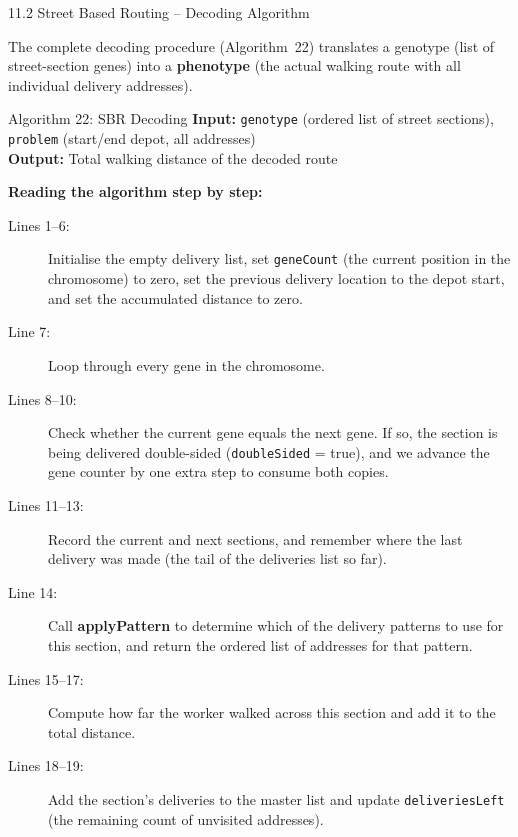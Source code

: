 \documentclass[aspectratio=169,10pt]{beamer}
\begin{document}
\begin{frame}[allowframebreaks]{11.2 Street Based Routing -- Decoding Algorithm}

  The complete decoding procedure (Algorithm~22) translates a genotype (list
  of street-section genes) into a \textbf{phenotype} (the actual walking route
  with all individual delivery addresses).

  \begin{block}{Algorithm 22: SBR Decoding}
    \textbf{Input:} \texttt{genotype} (ordered list of street sections),
    \texttt{problem} (start/end depot, all addresses)\\
    \textbf{Output:} Total walking distance of the decoded route
  \end{block}

  \textbf{Reading the algorithm step by step:}

  \begin{description}
    \item[Lines 1--6:] Initialise the empty delivery list, set
      \texttt{geneCount} (the current position in the chromosome) to zero,
      set the previous delivery location to the depot start, and set the
      accumulated distance to zero.
    \item[Line 7:] Loop through every gene in the chromosome.
    \item[Lines 8--10:] Check whether the current gene equals the next gene.
      If so, the section is being delivered double-sided (\texttt{doubleSided}
      = true), and we advance the gene counter by one extra step to consume
      both copies.
    \item[Lines 11--13:] Record the current and next sections, and remember
      where the last delivery was made (the tail of the deliveries list so
      far).
    \item[Line 14:] Call \textbf{applyPattern} to determine which of the
      delivery patterns to use for this section, and return the ordered list
      of addresses for that pattern.
    \item[Lines 15--17:] Compute how far the worker walked across this
      section and add it to the total distance.
    \item[Lines 18--19:] Add the section's deliveries to the master list and
      update \texttt{deliveriesLeft} (the remaining count of unvisited
      addresses).
  \end{description}

  \framebreak


\end{frame}
\end{document}
